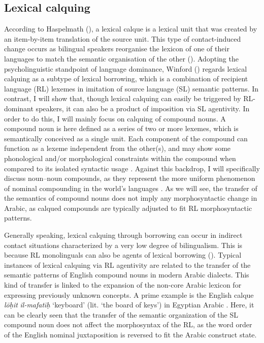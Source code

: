 \documentclass[output=paper]{langsci/langscibook}
\begin{document}
 \subsection{Lexical calquing}\label{sec:lex}

According to Haspelmath (\citeyear[39]{Haspelmath2009}), a lexical calque is a lexical unit that was created by an item-by-item translation of the source unit. This type of contact-induced change occurs as bilingual speakers reorganise the lexicon of one of their languages to match the semantic organisation of the other (\citealt[132]{Ross2007}). Adopting the psycholinguistic standpoint of language dominance, Winford (\citeyear[345]{Winford2003}) regards lexical calquing as a subtype of lexical borrowing, which is a combination of recipient language (RL) lexemes in imitation of source language (SL) semantic patterns. In contrast, I will show that, though lexical calquing can easily be triggered by RL-dominant speakers, it can also be a product of imposition via SL agentivity. In order to do this, I will mainly focus on calquing of compound nouns. A compound noun is here defined as a series of two or more lexemes, which is semantically conceived as a single unit. Each component of the compound can function as a lexeme independent from the other(s), and may show some phonological and/or morphological constraints within the compound when compared to its isolated syntactic usage \citep{Bauer2001}. Against this backdrop, I will specifically discuss noun–noun compounds, as they represent the more uniform phenomenon of nominal compounding in the world’s languages \cite{Pepperforthcoming}. As we will see, the transfer of the semantics of compound nouns does not imply any morphosyntactic change in Arabic, as calqued compounds are typically adjusted to fit RL morphosyntactic patterns.  

Generally speaking, lexical calquing through borrowing can occur in indirect contact situations characterized by a very low degree of bilingualism. This is because RL monolinguals can also be agents of lexical borrowing (\citealt[10]{VanCoetsem1988}). Typical instances of lexical calquing via RL agentivity are related to the transfer of the semantic patterns of English compound nouns in modern Arabic dialects. This kind of transfer is linked to the expansion of the non-core Arabic lexicon for expressing previously unknown concepts. A prime example is the English calque \textit{lōḥit} \textit{il-mafatīḥ} `keyboard' (lit. ‘the board of keys’) in Egyptian Arabic \citep[9]{WilmsenWoidich2011}. Here, it can be clearly seen that the transfer of the semantic organization of the SL compound noun does not affect the morphosyntax of the RL, as the word order of the English nominal juxtaposition is reversed to fit the Arabic construct state.  
\end{document}
